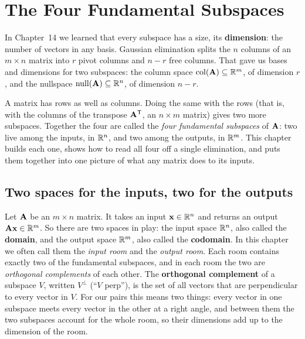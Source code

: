\chapter{The Four Fundamental Subspaces}

In Chapter~14 we learned that every subspace has a size, its \textbf{dimension}: the
number of vectors in any basis. Gaussian elimination splits the $n$ columns of an
$m \times n$ matrix into $r$ pivot columns and $n - r$ free columns. That gave us bases
and dimensions for two subspaces: the column space $\operatorname{col}(\mathbf{A}) \subseteq \mathbb{R}^m$, of
dimension $r$, and the nullspace $\operatorname{null}(\mathbf{A}) \subseteq \mathbb{R}^n$, of dimension $n - r$.

A matrix has rows as well as columns. Doing the same with the rows (that is, with the
columns of the transpose $\mathbf{A}^{\mathsf{T}}$, an $n \times m$ matrix) gives two more subspaces.
Together the four are called the \emph{four fundamental subspaces} of $\mathbf{A}$: two
live among the inputs, in $\mathbb{R}^n$, and two among the outputs, in $\mathbb{R}^m$. This chapter
builds each one, shows how to read all four off a single elimination, and puts them
together into one picture of what any matrix does to its inputs.

\section{Two spaces for the inputs, two for the outputs}

Let $\mathbf{A}$ be an $m \times n$ matrix. It takes an input $\mathbf{x}\in\mathbb{R}^n$ and returns
an output $\mathbf{A}\mathbf{x}\in\mathbb{R}^m$. So there are two spaces in play: the input space
$\mathbb{R}^n$, also called the \textbf{domain}, and the output space $\mathbb{R}^m$, also called the
\textbf{codomain}. In this chapter we often call them the \emph{input room} and the
\emph{output room}. Each room contains exactly two of the fundamental subspaces, and in
each room the two are \emph{orthogonal complements} of each other. The
\textbf{orthogonal complement} of a subspace $V$, written $V^\perp$ (``$V$ perp''), is the
set of all vectors that are perpendicular to every vector in $V$. For our pairs this means
two things: every vector in one subspace meets every vector in the other at a right
angle, and between them the two subspaces account for the whole room, so their
dimensions add up to the dimension of the room.

